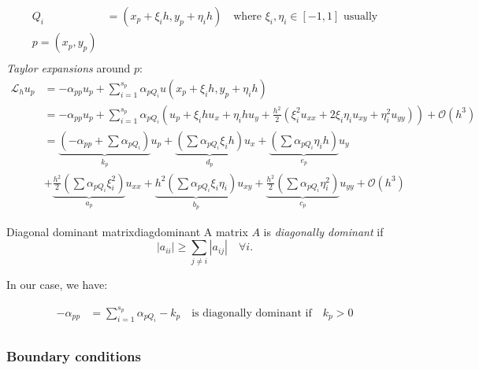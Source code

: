\begin{align*}
  Q_i & = (x_p + \xi_i h, y_p + \eta_i h) \quad \text{where } \xi_i, \eta_i \in [-1,1] \text{ usually} \\
  p = (x_p, y_p)                                                                                       \\
\end{align*}
\emph{Taylor expansions} around \(p\):
\begin{align*}
  \mathcal{L}_h u_p & = -\alpha_{pp} u_p + \sum_{i=1}^{s_p} \alpha_{pQ_i} u(x_p + \xi_i h, y_p + \eta_i h)                                                                                                                                                            \\
                    & = -\alpha_{pp} u_p + \sum_{i=1}^{s_p} \alpha_{pQ_i} \left( u_p + \xi_i h u_x + \eta_i h u_y + \frac{h^2}{2} (\xi_i^2 u_{xx} + 2\xi_i\eta_i u_{xy} + \eta_i^2 u_{yy})\right) + \mathcal{O}(h^3)                                                  \\
                    & = \underbrace{\left(-\alpha_{pp}+ \sum \alpha_{pQ_i}\right)}_{k_p} u_p + \underbrace{\left(\sum \alpha_{pQ_i} \xi_i h \right)}_{d_p} u_x + \underbrace{\left(\sum \alpha_{pQ_i} \eta_i h \right)}_{e_p} u_y                                     \\
                    & + \underbrace{\frac{h^2}{2} \left(\sum \alpha_{pQ_i} \xi_i^2\right)}_{a_p} u_{xx} + \underbrace{h^2\left(\sum \alpha_{pQ_i} \xi_i\eta_i\right)}_{b_p} u_{xy} + \underbrace{\frac{h^2}{2} \left(\sum \alpha_{pQ_i} \eta_i^2\right)}_{c_p} u_{yy}
  + \mathcal{O}(h^3)
\end{align*}

\begin{definition}{Diagonal dominant matrix}{diagdominant}
  A matrix \(A\) is \emph{diagonally dominant} if
  \[
    |a_{ii}| \geq \sum_{j \neq i} |a_{ij}| \quad \forall i.
  \]

\end{definition}

In our case, we have:

\begin{align*}
  -\alpha_{pp} & = \sum_{i=1}^{s_p} \alpha_{pQ_i} - k_p \quad \text{is diagonally dominant if} \quad k_p >0 \\
\end{align*}

\subsubsection{Boundary conditions}

